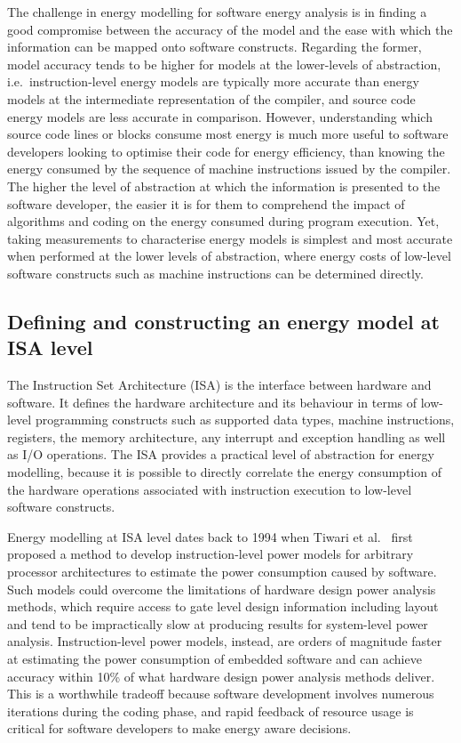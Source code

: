 The challenge in energy modelling for software energy analysis is in finding a good compromise between the accuracy of the model and the ease with which the information can be mapped onto software constructs. Regarding the former, model accuracy tends to be higher for models at the lower-levels of abstraction, i.e.\ instruction-level energy models are typically more accurate than energy models at the intermediate representation of the compiler, and source code energy models are less accurate in comparison. 
%
However, understanding which source code lines or blocks consume most energy is much more useful to software developers looking to optimise their code for energy efficiency, than knowing the energy consumed by the sequence of machine instructions issued by the compiler. The higher the level of abstraction at which the information is presented to the software developer, the easier it is for them to comprehend the impact of algorithms and coding on the energy consumed during program execution. Yet, taking measurements to characterise energy models is simplest and most accurate when performed at the lower levels of abstraction, where energy costs of low-level software constructs such as machine instructions can be determined directly.



\subsection{Defining and constructing an energy model at ISA level}\label{subsec:isa}

The Instruction Set Architecture (ISA) is the interface between hardware and
software. 
%
It defines the hardware architecture and its behaviour in terms of low-level
programming constructs such as supported data types, machine instructions,
registers, the memory architecture, any interrupt and exception handling as
well as I/O operations.
%
The ISA provides a practical level of abstraction for energy modelling, because
it is possible to directly correlate the energy consumption of the hardware
operations associated with instruction execution to low-level software
constructs.

Energy modelling at ISA level dates back to 1994 when Tiwari et
al.~\cite{Tiwari-embedded-1994} first proposed a
method to develop instruction-level power models for arbitrary
processor architectures to estimate the power consumption caused by software.
%
Such models could overcome the limitations of hardware design power analysis
methods, which require access to gate level design information including layout
and tend to be impractically slow at producing results for system-level power
analysis. Instruction-level power models, instead, are orders of magnitude
faster at estimating the power consumption of embedded software and can achieve
accuracy within 10\% of what hardware design power analysis methods deliver.
This is a worthwhile tradeoff because software development involves numerous
iterations during the coding phase, and rapid feedback of resource usage is
critical for software developers to make energy aware decisions.

